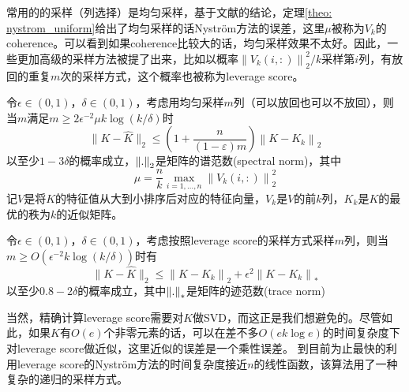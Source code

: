 常用的的采样（列选择）是均匀采样，基于文献\cite{gittens2016revisiting}的结论，定理\ref{theo: nystrom_uniform}给出了均匀采样的话Nyström方法的误差，这里$\mu$被称为$V_k$的coherence。可以看到如果coherence比较大的话，均匀采样效果不太好。因此，一些更加高级的采样方法被提了出来，比如以概率$\left\|V_{k}(i,:)\right\|_{2}^{2}/k$采样第$i$列，有放回的重复$m$次的采样方式，这个概率也被称为leverage score。
\begin{theorem}
    \label{theo: nystrom_uniform}
    令$\epsilon \in (0,1)$，$\delta \in (0,1)$，考虑用均匀采样$m$列（可以放回也可以不放回），则当$m$满足$m \geq 2 \epsilon^{-2} \mu k \log (k / \delta)$时
    \begin{equation}
        \|K-\hat{K}\|_{2} \leq\left(1+\frac{n}{(1-\varepsilon) m}\right)\left\|K-K_{k}\right\|_{2}
    \end{equation}
    以至少$1-3\delta$的概率成立，$\left\lVert.\right\rVert_2$是矩阵的谱范数(spectral norm)，其中
    \begin{equation}
        \mu=\frac{n}{k} \max _{i=1, \ldots, n}\left\|V_{k}(i,:)\right\|_{2}^{2}
    \end{equation}
    记$V$是将$K$的特征值从大到小排序后对应的特征向量，$V_{k}$是$V$的前$k$列，$K_k$是$K$的最优的秩为$k$的近似矩阵。
\end{theorem}
\begin{theorem}
    令$\epsilon \in (0,1)$，$\delta \in (0,1)$，考虑按照leverage score的采样方式采样$m$列，则当$m \geq O\left(\epsilon^{-2} k \log (k / \delta)\right)$时有
    \begin{equation}
        \|K-\hat{K}\|_{2} \leq\left\|K-K_{k}\right\|_{2}+\epsilon^{2}\left\|K-K_{k}\right\|_{*}
    \end{equation}
    以至少$0.8-2\delta$的概率成立，其中$\left\lVert.\right\rVert_{*}$是矩阵的迹范数(trace norm)
\end{theorem}
当然，精确计算leverage score需要对$K$做SVD，而这正是我们想避免的。尽管如此，如果$K$有$O(e)$个非零元素的话，可以在差不多$O(ek \log e)$的时间复杂度下对leverage score做近似，这里近似的误差是一个乘性误差。
到目前为止最快的利用leverage score的Nyström方法的时间复杂度接近$n$的线性函数，该算法用了一种复杂的递归的采样方式。


